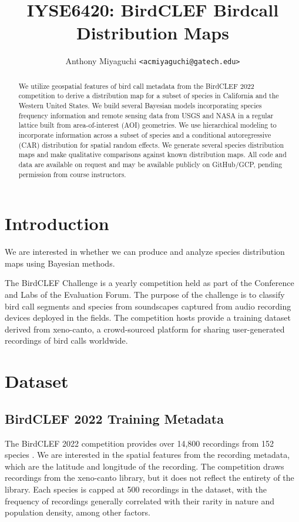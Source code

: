 \documentclass[notitlepage]{article}
\title{IYSE6420: BirdCLEF Birdcall Distribution Maps}
\author{
    Anthony Miyaguchi \texttt{<acmiyaguchi@gatech.edu>}
}
\begin{document}
\maketitle
\thispagestyle{empty}

\begin{abstract}

We utilize geospatial features of bird call metadata from the BirdCLEF 2022 competition to derive a distribution map for a subset of species in California and the Western United States.
We build several Bayesian models incorporating species frequency information and remote sensing data from USGS and NASA in a regular lattice built from area-of-interest (AOI) geometries. 
We use hierarchical modeling to incorporate information across a subset of species and a conditional autoregressive (CAR) distribution for spatial random effects.
We generate several species distribution maps and make qualitative comparisons against known distribution maps.
All code and data are available on request and may be available publicly on GitHub/GCP, pending permission from course instructors.

\end{abstract}

\section{Introduction}

We are interested in whether we can produce and analyze species distribution maps using Bayesian methods.

The BirdCLEF Challenge is a yearly competition held as part of the Conference and Labs of the Evaluation Forum.
The purpose of the challenge is to classify bird call segments and species from soundscapes captured from audio recording devices deployed in the fields.
The competition hosts provide a training dataset derived from xeno-canto, a crowd-sourced platform for sharing user-generated recordings of bird calls worldwide.

\section{Dataset}
\subsection{BirdCLEF 2022 Training Metadata}

The BirdCLEF 2022 competition provides over 14,800 recordings from 152 species \cite{kahl2022overview}.
We are interested in the spatial features from the recording metadata, which are the latitude and longitude of the recording.
The competition draws recordings from the xeno-canto library, but it does not reflect the entirety of the library.
Each species is capped at 500 recordings in the dataset, with the frequency of recordings generally correlated with their rarity in nature and population density, among other factors.
\end{document}
